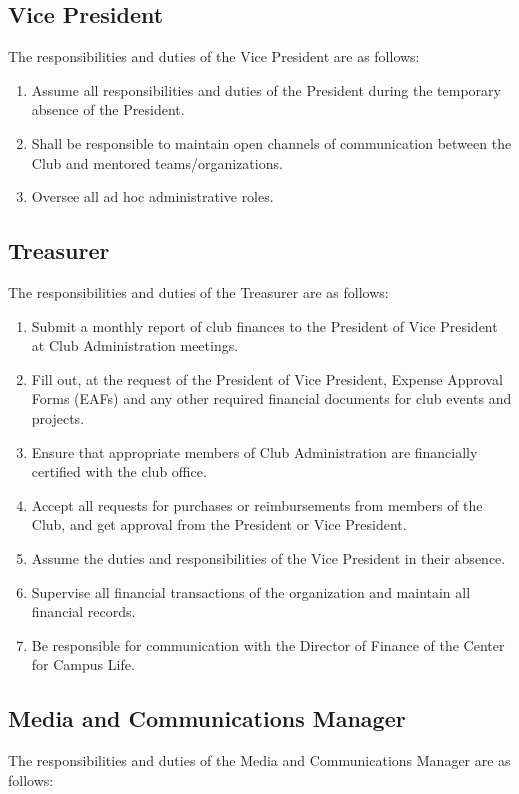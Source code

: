 \documentclass[english,11pt]{article}
\begin{document}
\subsection{Vice President} \label{sect:cadmin:vicepresident}
The responsibilities and duties of the Vice President are as follows:

\begin{enumerate}[label=\Alph*.]	
    \item Assume all responsibilities and duties of the President during the temporary absence of the President.
    \item Shall be responsible to maintain open channels of communication between the Club and mentored teams/organizations.
    \item Oversee all ad hoc administrative roles.
\end{enumerate}

\subsection{Treasurer} \label{sect:cadmin:treasurer}
The responsibilities and duties of the Treasurer are as follows:

\begin{enumerate}[label=\Alph*.]
    \item Submit a monthly report of club finances to the President of Vice President at Club Administration meetings.
    \item Fill out, at the request of the President of Vice President, Expense Approval Forms (EAFs) and any other required financial documents for club events and projects.
    \item Ensure that appropriate members of Club Administration are financially certified with the club office.
    \item Accept all requests for purchases or reimbursements from members of the Club, and get approval from the President or Vice President.
    \item Assume the duties and responsibilities of the Vice President in their absence.
    \item Supervise all financial transactions of the organization and maintain all financial records.
    \item Be responsible for communication with the Director of Finance of the Center for Campus Life.
\end{enumerate}

\subsection{Media and Communications Manager} \label{sect:cadmin:mediacomms}
The responsibilities and duties of the Media and Communications Manager are as follows:
\end{document}

